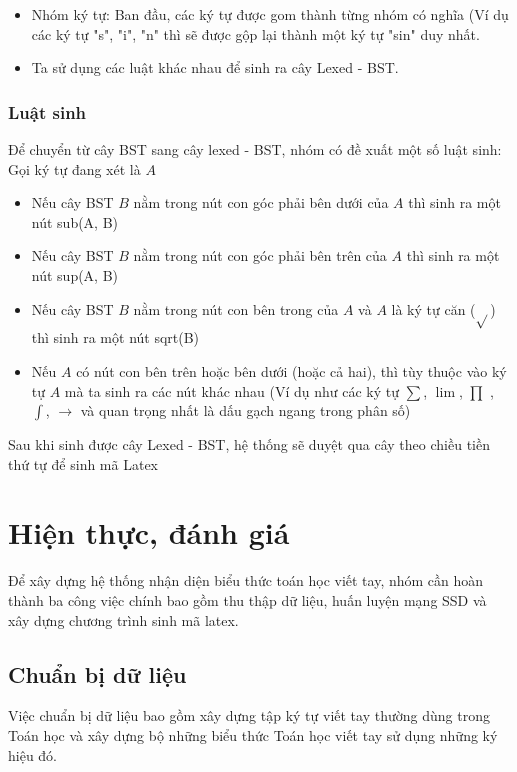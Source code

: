 \documentclass[a4paper,12pt]{article}
\begin{document}
	\begin{itemize}
		\item Nhóm ký tự: Ban đầu, các ký tự được gom thành từng nhóm có nghĩa (Ví dụ các ký tự "s", "i", "n" thì sẽ được gộp lại thành một ký tự "sin" duy nhất.
		\item Ta sử dụng các luật khác nhau để sinh ra cây Lexed - BST\cite{zanibbi}.
	\end{itemize}
	
	\subsubsection*{Luật sinh}
	
	
	Để chuyển từ cây BST\cite{zanibbi} sang cây lexed - BST\cite{zanibbi}, nhóm có đề xuất một số luật sinh: \\
	Gọi ký tự đang xét là $A$
	\begin{itemize}
		\item Nếu cây BST $B$ nằm trong nút con góc phải bên dưới của $A$ thì sinh ra một nút sub(A, B)
		\item Nếu cây BST $B$ nằm trong nút con góc phải bên trên của $A$ thì sinh ra một nút sup(A, B)
		\item Nếu cây BST $B$ nằm trong nút con bên trong của $A$ và $A$ là ký tự căn ($\sqrt{}$) thì sinh ra một nút sqrt(B)
		\item Nếu $A$ có nút con bên trên hoặc bên dưới (hoặc cả hai), thì tùy thuộc vào ký tự $A$ mà ta sinh ra các nút khác nhau (Ví dụ như các ký tự $\sum$, $\lim$, $\prod$ , $\int$, $\rightarrow$ và quan trọng nhất là dấu gạch ngang trong phân số)
		
	\end{itemize}
	
	Sau khi sinh được cây Lexed - BST\cite{zanibbi}, hệ thống sẽ duyệt qua cây theo chiều tiền thứ tự để sinh mã Latex
	
	\newpage
	\section{Hiện thực, đánh giá}
	
	Để xây dựng hệ thống nhận diện biểu thức toán học viết tay, nhóm cần hoàn thành ba công việc chính bao gồm thu thập dữ liệu, huấn luyện mạng SSD và xây dựng chương trình sinh mã latex.
	
	\subsection{Chuẩn bị dữ liệu}
	Việc chuẩn bị dữ liệu bao gồm xây dựng tập ký tự viết tay thường dùng trong Toán học và xây dựng bộ những biểu thức Toán học viết tay sử dụng những ký hiệu đó.
\end{document}
